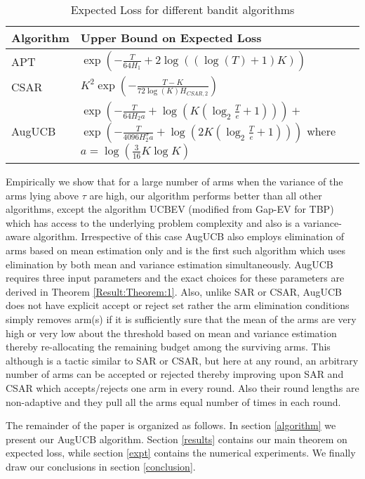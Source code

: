 \begin{table}[h]
\caption{Expected Loss for different bandit algorithms}
\label{tab:regret-bds}
\begin{center}
\begin{tabular}{|p{1.3cm}|p{6.33cm}|}
\toprule
Algorithm  & Upper Bound on Expected Loss \\
\midrule
APT         &$\exp(-\frac{T}{64 H_1}+2\log((\log(T)+1)K))$ \\\midrule
CSAR		&$K^2\exp(-\frac{T-K}{72\log(K)H_{CSAR,2}})$ \\\midrule
AugUCB      &
$\exp\left( -\frac{T}{ 64 H_2 a} + \log\left(K\left(\log_2\frac{T}{e}+1\right)\right)\right)+$\newline
 $ \exp\left(- \frac{T}{4096 H_{2}^{\sigma} a}
 + \log\left(2K\left(\log_2\frac{T}{e}+1\right)\right) \right) $\newline
 where $a=\log(\frac{3}{16} K\log K)$
\\\bottomrule
\end{tabular}
\end{center}
\end{table}
Empirically we show that for a large number of arms when the variance of the arms lying above $\tau$ are high, our algorithm performs better than all other algorithms, except the algorithm UCBEV (modified from Gap-EV for TBP) which has access to the underlying problem complexity and also is a variance-aware algorithm. Irrespective of this case AugUCB also employs elimination of arms based on mean estimation only and is the first such algorithm which uses elimination by both mean and variance estimation simultaneously. AugUCB requires three input parameters and the exact choices for these parameters are derived in Theorem \ref{Result:Theorem:1}. Also, unlike SAR or CSAR, AugUCB does not have explicit accept or reject set rather the arm elimination conditions simply removes arm(s) if it is sufficiently sure that the mean of the arms are very high or very low about the threshold based on mean and variance estimation thereby re-allocating the remaining budget among the surviving arms. This although is a tactic similar to SAR or CSAR, but here at any round, an arbitrary number of arms can be accepted or rejected thereby improving upon SAR and CSAR which accepts/rejects one arm in every round. Also their round lengths are non-adaptive and they pull all the arms equal number of times in each round. 

The remainder of the paper is organized as follows. In section \ref{algorithm} we present our AugUCB algorithm. 
Section \ref{results} contains our main theorem on expected loss, while section \ref{expt} contains the numerical experiments. We finally draw our conclusions in section \ref{conclusion}.
